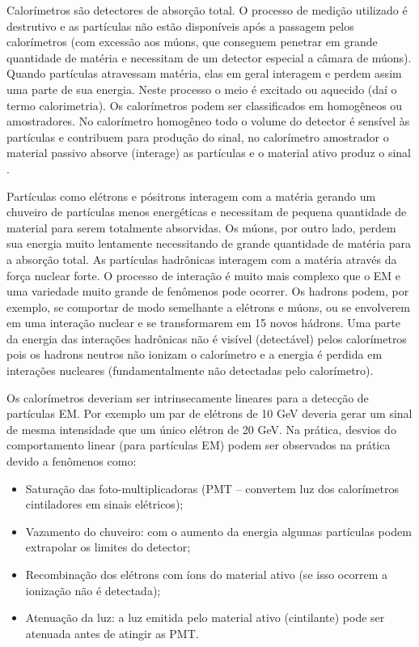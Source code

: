 Calorímetros são detectores de absorção total. O processo de medição utilizado é destrutivo e as partículas não estão disponíveis após a passagem pelos calorímetros (com excessão aos múons, que conseguem penetrar em grande quantidade de matéria e necessitam de um detector especial a câmara de múons). Quando partículas atravessam matéria, elas em geral interagem e perdem assim uma parte de sua energia. Neste processo o meio é excitado ou aquecido (daí o termo calorimetria). Os calorímetros podem ser classificados em homogêneos ou amostradores. No calorímetro homogêneo todo o volume do detector é sensível às partículas e contribuem para produção do sinal, no calorímetro amostrador o material passivo absorve (interage) as partículas e o material ativo produz o sinal \cite{book:wigmans:2000}.

Partículas como elétrons e pósitrons interagem com a matéria gerando um chuveiro de partículas menos energéticas e necessitam de pequena quantidade de material para serem totalmente absorvidas. Os múons, por outro lado, perdem sua energia muito lentamente necessitando de grande quantidade de matéria para a absorção total. As partículas hadrônicas interagem com a matéria através da força nuclear forte. O processo de interação é muito mais complexo que o EM e uma variedade muito grande de fenômenos pode ocorrer. Os hadrons podem, por exemplo, se comportar de modo semelhante a elétrons e múons, ou se envolverem em uma interação nuclear e se transformarem em 15 novos hádrons. Uma parte da energia das interações hadrônicas não é visível (detectável) pelos calorímetros pois os hadrons neutros não ionizam o calorímetro e a energia é perdida em interações nucleares (fundamentalmente não detectadas pelo calorímetro).

Os calorímetros deveriam ser intrinsecamente lineares para a detecção de partículas EM. Por exemplo um par de elétrons de 10 GeV deveria gerar um sinal de mesma intensidade que um único elétron de 20 GeV. Na prática, desvios do comportamento linear (para partículas EM) podem ser observados na prática devido a fenômenos como:
\begin{itemize}
	\item Saturação das foto-multiplicadoras (PMT – convertem luz dos calorímetros cintiladores em sinais elétricos);
	\item Vazamento do chuveiro: com o aumento da energia algumas partículas podem extrapolar os limites do detector;
	\item Recombinação dos elétrons com íons do material ativo (se isso ocorrem a ionização não é detectada);
	\item Atenuação da luz: a luz emitida pelo material ativo (cintilante) pode ser atenuada antes de atingir as PMT.
\end{itemize}

